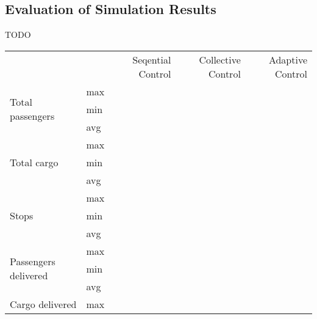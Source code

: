 \subsection{Evaluation of Simulation Results}
TODO

\begin{table}[]
\centering
\begin{table}[]
\begin{tabular}{llrrr}
                                      &     & Seqential Control    & Collective Control   & Adaptive Control     \\
\multirow{3}{*}{Total passengers}     & max &                      &                      &                      \\
                                      & min &                      &                      &                      \\
                                      & avg &                      &                      &                      \\
\multirow{3}{*}{Total cargo}          & max &                      &                      &                      \\
                                      & min &                      &                      &                      \\
                                      & avg &                      &                      &                      \\
\multirow{3}{*}{Stops}                & max &                      &                      &                      \\
                                      & min &                      &                      &                      \\
                                      & avg &                      &                      &                      \\
\multirow{3}{*}{Passengers delivered} & max &                      &                      &                      \\
                                      & min &                      &                      &                      \\
                                      & avg &                      &                      &                      \\
\multirow{3}{*}{Cargo delivered}      & max &                      &                      &                      \\

\end{tabular}
\end{table}
\end{table}
